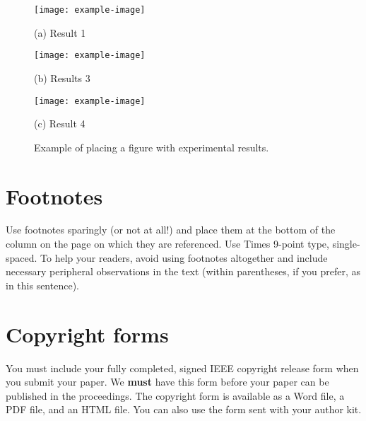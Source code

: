 \documentclass{article}
\begin{document}
\begin{figure}[htb]

\begin{minipage}[b]{1.0\linewidth}
  \centering
  \centerline{\texttt{[image: example-image]}}
  \centerline{(a) Result 1}\medskip
\end{minipage}
%
\begin{minipage}[b]{.48\linewidth}
  \centering
  \centerline{\texttt{[image: example-image]}}
  \centerline{(b) Results 3}\medskip
\end{minipage}
\hfill
\begin{minipage}[b]{0.48\linewidth}
  \centering
  \centerline{\texttt{[image: example-image]}}
  \centerline{(c) Result 4}\medskip
\end{minipage}
%
\caption{Example of placing a figure with experimental results.}
\label{fig:res}
%
\end{figure}

\vfill
\pagebreak


\section{Footnotes}
\label{sec:foot}

Use footnotes sparingly (or not at all!) and place them at the bottom of the
column on the page on which they are referenced. Use Times 9-point type,
single-spaced. To help your readers, avoid using footnotes altogether and
include necessary peripheral observations in the text (within parentheses, if
you prefer, as in this sentence).


\section{Copyright forms}
\label{sec:copyright}

You must include your fully completed, signed IEEE copyright release form when
you submit your paper. We {\bf must} have this form before your paper can be
published in the proceedings.  The copyright form is available as a Word file,
a PDF file, and an HTML file. You can also use the form sent with your author
kit.
\end{document}
